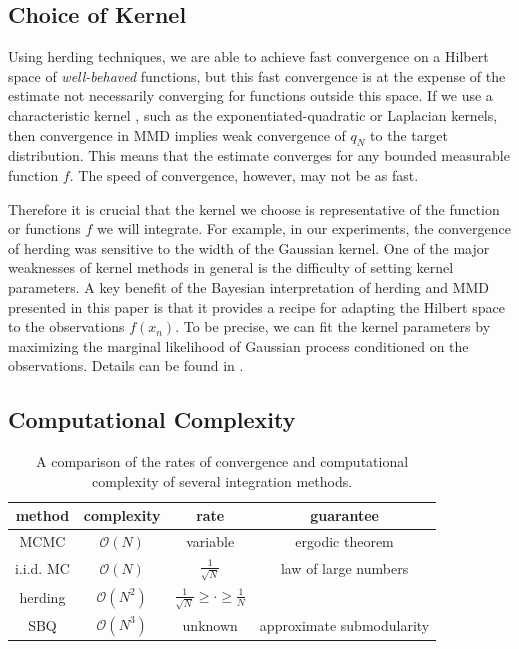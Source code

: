 \subsection{Choice of Kernel}

Using herding techniques, we are able to achieve fast convergence on a Hilbert space of \emph{well-behaved} functions, but this fast convergence is at the expense of the estimate not necessarily converging for functions outside this space.
If we use a characteristic kernel \citep{Sriperumbudur2008}, such as the exponentiated-quadratic or Laplacian kernels, then convergence in MMD implies weak convergence of $q_N$ to the target distribution. 
This means that the estimate converges for any bounded measurable function $f$. The speed of convergence, however, may not be as fast.

Therefore it is crucial that the kernel we choose is representative of the function or functions $f$ we will integrate. For example, in our experiments, the convergence of herding was sensitive to the width of the Gaussian kernel. One of the major weaknesses of kernel methods in general is the difficulty of setting kernel parameters. A key benefit of the Bayesian interpretation of herding and MMD presented in this paper is that it provides a recipe for adapting the Hilbert space to the observations $f(x_n)$. To be precise, we can fit the kernel parameters by maximizing the marginal likelihood of Gaussian process conditioned on the observations. Details can be found in \citep{Rasmussen2006,Osborne2012}.

\subsection{Computational Complexity}

\begin{table}[t]
\begin{center}
	\begin{tabular}{c|ccc}
		method & complexity & rate & guarantee\\
		\midrule
		MCMC & $\mathcal{O}(N)$ & variable & ergodic theorem\\
		i.i.d. MC & $\mathcal{O}(N)$ & $\frac{1}{\sqrt{N}}$ & law of large numbers\\
		herding & $\mathcal{O}(N^2)$ & $\frac{1}{\sqrt{N}} \geq \cdot \geq \frac{1}{N}$ & \citep{chen2010super,bach2012equivalence} \\
		SBQ & $\mathcal{O}(N^3)$ & unknown & approximate submodularity\\
	\end{tabular}
\end{center}
\caption{A comparison of the rates of convergence and computational complexity of several integration methods.}
\label{tbl:rates}
\end{table}

